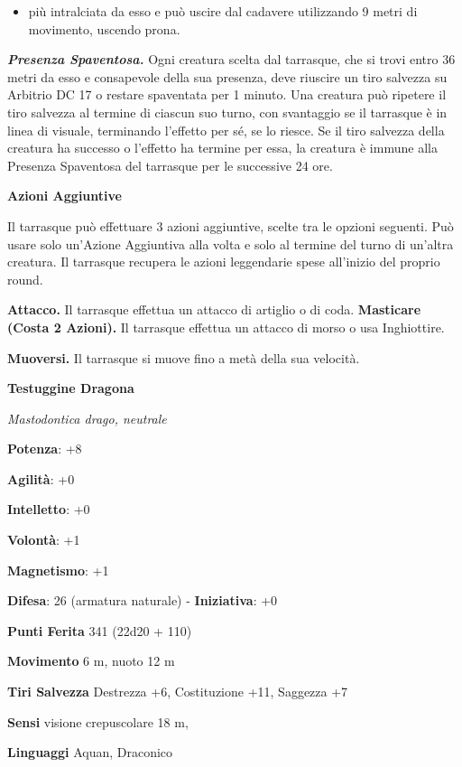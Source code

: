 \begin{multicols}{2}
\begin{itemize}
\item
  più intralciata da esso e può uscire dal cadavere utilizzando 9 metri
  di movimento, uscendo prona.
\end{itemize}


\emph{\textbf{Presenza Spaventosa.}} Ogni creatura scelta dal tarrasque,
che si trovi entro 36 metri da esso e consapevole della sua presenza,
deve riuscire un tiro salvezza su Arbitrio DC 17 o restare spaventata
per 1 minuto. Una creatura può ripetere il tiro salvezza al termine di
ciascun suo turno, con svantaggio se il tarrasque è in linea di visuale,
terminando l'effetto per sé, se lo riesce. Se il tiro salvezza della
creatura ha successo o l'effetto ha termine per essa, la creatura è
immune alla Presenza Spaventosa del tarrasque per le successive 24 ore.

\textbf{Azioni Aggiuntive}

Il tarrasque può effettuare 3 azioni aggiuntive, scelte tra le opzioni
seguenti. Può usare solo un'Azione Aggiuntiva alla volta e solo al
termine del turno di un'altra creatura. Il tarrasque recupera le azioni
leggendarie spese all'inizio del proprio round.

\textbf{Attacco.} Il tarrasque effettua un attacco di artiglio o di
coda. \textbf{Masticare (Costa 2 Azioni).} Il tarrasque effettua un
attacco di morso o usa Inghiottire.

\textbf{Muoversi.} Il tarrasque si muove fino a metà della sua velocità.




\textbf{Testuggine Dragona}

\emph{Mastodontica drago, neutrale}

\textbf{Potenza}: +8

\textbf{Agilità}: +0

\textbf{Intelletto}: +0

\textbf{Volontà}: +1

\textbf{Magnetismo}: +1

\textbf{Difesa}: 26 (armatura naturale) - \textbf{Iniziativa}: +0

\textbf{Punti Ferita} 341 (22d20 + 110)

\textbf{Movimento} 6 m, nuoto 12 m

\textbf{Tiri Salvezza} Destrezza +6, Costituzione +11, Saggezza +7

\textbf{Sensi} visione crepuscolare 18 m, 

\textbf{Linguaggi} Aquan, Draconico


\end{multicols}
